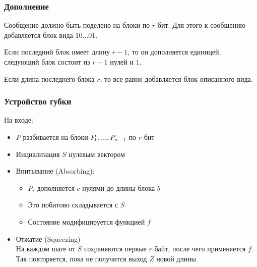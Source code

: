 \documentclass[a4paper, 14pt]{extarticle}
\begin{document}
\FloatBarrier{}
\subsubsection{Дополнение}
Сообщение должно быть поделено на блоки по $r$ бит. Для этого к сообщению добавляется блок вида $10\ldots01$.

Если последний блок имеет длину $r-1$, то он дополняется единицей, следующий блок состоит из $r-1$ нулей и $1$.

Если длина последнего блока $r$, то все равно добавляется блок описанного вида.

\subsubsection{Устройство губки}
На входе:
\begin{itemize}
    \item $P$ разбивается на блоки $P_0, \ldots, P_{n-1}$ по $r$ бит
    \item Инциализация $S$ нулевым вектором
    \item Впитывание (Absorbing):
        \begin{itemize}
            \item $P_i$ дополняется $c$ нулями до длины блока $b$
            \item Это побитово складывается с $S$
            \item Состояние модифицируется функцией $f$
        \end{itemize}
    \item Отжатие (Squeezing)\\
    На каждом шаге от $S$ сохраняются первые $r$ байт, после чего применяется $f$. Так повторяется, пока не получится выход $Z$ новой длины

\end{itemize}
\end{document}
